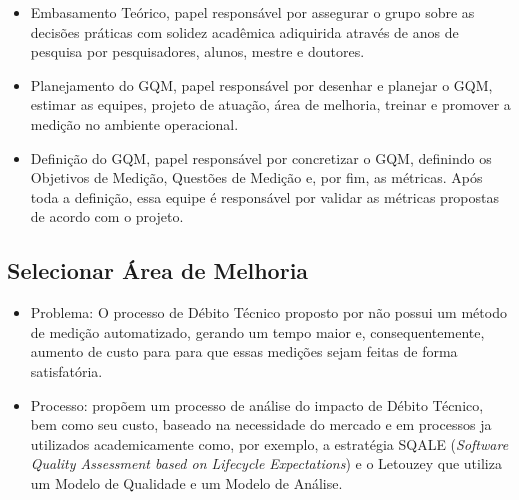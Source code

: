\begin{itemize}
  \item Embasamento Teórico, papel responsável por assegurar o grupo sobre as decisões
  práticas com solidez acadêmica adiquirida através de anos de pesquisa por pesquisadores,
  alunos, mestre e doutores.

  \item Planejamento do GQM, papel responsável por desenhar e planejar o GQM, estimar
  as equipes, projeto de atuação, área de melhoria, treinar e promover a medição
  no ambiente operacional.

  \item Definição do GQM, papel responsável por concretizar o GQM, definindo os
  Objetivos de Medição, Questões de Medição e, por fim, as métricas. Após toda a
  definição, essa equipe é responsável por validar as métricas propostas de acordo
  com o projeto.

\end{itemize}

\subsection{Selecionar Área de Melhoria}
\begin{itemize}
  \item Problema: O processo de Débito Técnico proposto por  \cite{td} não possui
  um método de medição automatizado, gerando um tempo maior e, consequentemente, aumento de custo
  para para que essas medições sejam feitas de forma satisfatória.

  \item Processo: \cite{td} propõem um processo de análise do impacto de Débito Técnico,
  bem como seu custo, baseado na necessidade do mercado e em processos ja utilizados academicamente como,
  por exemplo, a estratégia SQALE (\textit{Software Quality Assessment based on Lifecycle Expectations}) e o
  Letouzey que utiliza um Modelo de Qualidade e um Modelo de Análise.
\end{itemize}

